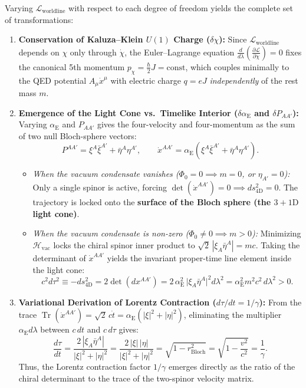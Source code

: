 \documentclass[11pt,a4paper]{article}
\begin{document}
Varying $\mathcal{L}_{\text{worldline}}$ with respect to each degree of freedom yields the complete set of transformations:
\begin{enumerate}
    \item \textbf{Conservation of Kaluza--Klein $U(1)$ Charge ($\delta \chi$):}
    Since $\mathcal{L}_{\text{worldline}}$ depends on $\chi$ only through $\dot{\chi}$, the Euler--Lagrange equation $\frac{d}{d\lambda}\left(\frac{\partial \mathcal{L}}{\partial \dot{\chi}}\right) = 0$ fixes the canonical 5th momentum $p_\chi = \frac{\hbar}{2}J = \text{const}$, which couples minimally to the QED potential $A_\mu \dot{x}^\mu$ with electric charge $q = e J$ \emph{independently} of the rest mass $m$.
    \item \textbf{Emergence of the Light Cone vs.\ Timelike Interior ($\delta \alpha_{\text{E}}$ and $\delta P_{AA'}$):}
    Varying $\alpha_{\text{E}}$ and $P_{AA'}$ gives the four-velocity and four-momentum as the sum of two null Bloch-sphere vectors:
    \begin{equation}
    P^{AA'} = \xi^A \bar{\xi}^{A'} + \bar{\eta}^A \eta^{A'}, \qquad \dot{x}^{AA'} = \alpha_{\text{E}} \left( \xi^A \bar{\xi}^{A'} + \bar{\eta}^A \eta^{A'} \right).
    \end{equation}
    \begin{itemize}
        \item \emph{When the vacuum condensate vanishes ($\Phi_0 = 0 \implies m = 0$, or $\eta_{A'} = 0$):} Only a single spinor is active, forcing $\det(\dot{x}^{AA'}) = 0 \implies ds_{4\text{D}}^2 = 0$. The trajectory is locked onto the \textbf{surface of the Bloch sphere (the $3+1\text{D}$ light cone)}.
        \item \emph{When the vacuum condensate is non-zero ($\Phi_0 \neq 0 \implies m > 0$):} Minimizing $\mathcal{H}_{\text{vac}}$ locks the chiral spinor inner product to $\sqrt{2}\,|\xi_A \bar{\eta}^A| = mc$. Taking the determinant of $\dot{x}^{AA'}$ yields the invariant proper-time line element inside the light cone:
        \begin{equation}
        c^2 d\tau^2 \equiv -ds_{4\text{D}}^2 = 2\det(dx^{AA'}) = 2\,\alpha_{\text{E}}^2\,\big|\xi_A \bar{\eta}^A\big|^2 d\lambda^2 = \alpha_{\text{E}}^2 m^2 c^2\, d\lambda^2 > 0.
        \end{equation}
    \end{itemize}
    \item \textbf{Variational Derivation of Lorentz Contraction ($d\tau / dt = 1/\gamma$):}
    From the trace $\operatorname{Tr}(\dot{x}^{AA'}) = \sqrt{2}\,c\dot{t} = \alpha_{\text{E}}(|\xi|^2 + |\eta|^2)$, eliminating the multiplier $\alpha_{\text{E}} d\lambda$ between $c\,dt$ and $c\,d\tau$ gives:
    \begin{equation}
    \frac{d\tau}{dt} = \frac{2\,|\xi_A \bar{\eta}^A|}{|\xi|^2 + |\eta|^2} = \frac{2\,|\xi|\,|\eta|}{|\xi|^2 + |\eta|^2} = \sqrt{1 - r_{\text{Bloch}}^2} = \sqrt{1 - \frac{v^2}{c^2}} = \frac{1}{\gamma}.
    \end{equation}
    Thus, the Lorentz contraction factor $1/\gamma$ emerges directly as the ratio of the chiral determinant to the trace of the two-spinor velocity matrix.
\end{enumerate}
\end{document}
